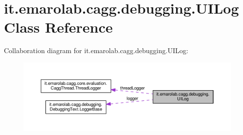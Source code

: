 \hypertarget{classit_1_1emarolab_1_1cagg_1_1debugging_1_1UILog}{\section{it.\-emarolab.\-cagg.\-debugging.\-U\-I\-Log Class Reference}
\label{classit_1_1emarolab_1_1cagg_1_1debugging_1_1UILog}
}


Collaboration diagram for it.\-emarolab.\-cagg.\-debugging.\-U\-I\-Log\-:\nopagebreak
\begin{figure}[H]
\begin{center}
\leavevmode
\includegraphics[width=350pt]{classit_1_1emarolab_1_1cagg_1_1debugging_1_1UILog__coll__graph}
\end{center}
\end{figure}
